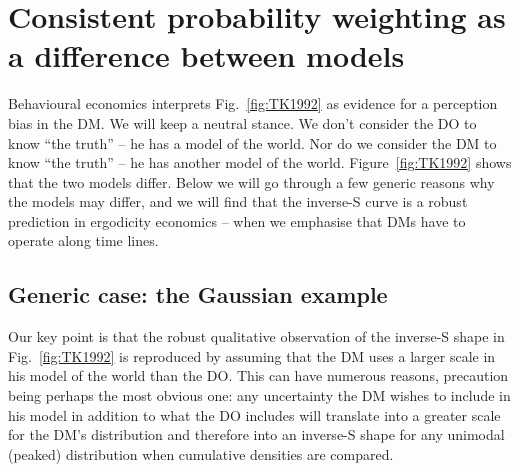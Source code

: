 \documentclass[%
	11pt,
	abstract=true,	
	bibliography=oldstyle					%
]{scrartcl}
\newcommand{\seclabel}[1]{\label{sec:#1}}
\newcommand{\fref}[1]{Fig.~\ref{fig:#1}}
\newcommand{\Fref}[1]{Figure~\ref{fig:#1}}
\numberwithin{equation}{section}
\begin{document}
%
%

\section{Consistent probability weighting as a difference between models} \seclabel{ModelDiff}

Behavioural economics interprets \fref{TK1992} as evidence for  a perception bias in the DM. We will keep a neutral stance. We don't consider the DO to know ``the truth'' -- he has a model of the world. Nor do we consider the DM to know ``the truth'' -- he has another model of the world. \Fref{TK1992} shows that the two models differ. Below we will go through a few generic reasons why the models may differ, and we will find that the inverse-S curve is a robust prediction in ergodicity economics -- when we emphasise that DMs have to operate along time lines.


\subsection{Generic case: the Gaussian example}
Our key point is that the robust qualitative observation of the inverse-S shape in \fref{TK1992} is reproduced by assuming that the DM uses a larger scale in his model of the world than the DO. This can have numerous reasons, precaution being perhaps the most obvious one: any uncertainty the DM wishes to include in his model in addition to what the DO includes will translate into a greater scale for the DM's distribution and therefore into an inverse-S shape for any unimodal (peaked) distribution when cumulative densities are compared.
\end{document}
